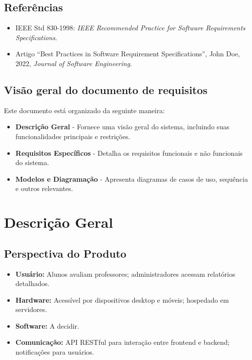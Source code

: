 \documentclass[12pt]{article}
\begin{document}
  \subsection{Referências}

  \begin{itemize}
    \item IEEE Std 830-1998: \textit{IEEE Recommended Practice for Software Requirements Specifications}.
    \item Artigo ``Best Practices in Software Requirement Specifications'', John Doe, 2022, \textit{Journal of Software Engineering}.
  \end{itemize}

  \subsection{Visão geral do documento de requisitos}

  Este documento está organizado da seguinte maneira:
  \begin{itemize}
    \item \textbf{Descrição Geral} - Fornece uma visão geral do sistema, incluindo suas funcionalidades principais e restrições.
    \item \textbf{Requisitos Específicos} - Detalha os requisitos funcionais e não funcionais do sistema.
    \item \textbf{Modelos e Diagramação} - Apresenta diagramas de casos de uso, sequência e outros relevantes.
  \end{itemize}

  \section{Descrição Geral}
  \subsection{Perspectiva do Produto}
  \begin{itemize}
      \item \textbf{Usuário:} Alunos avaliam professores; administradores acessam relatórios detalhados.
      \item \textbf{Hardware:} Acessível por dispositivos desktop e móveis; hospedado em servidores.
      \item \textbf{Software:} A decidir.
      \item \textbf{Comunicação:} API RESTful para interação entre frontend e backend; notificações para usuários.
  \end{itemize}
\end{document}
